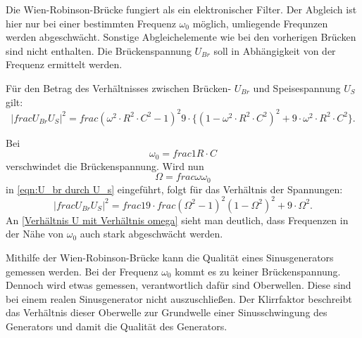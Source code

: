 Die Wien-Robinson-Brücke fungiert als ein elektronischer Filter.
Der Abgleich ist hier nur bei einer bestimmten Frequenz $\omega_0$ möglich, umliegende Frequnzen werden abgeschwächt.
Sonstige Abgleichelemente wie bei den vorherigen Brücken sind nicht enthalten.
Die Brückenspannung $U_{Br}$ soll in Abhängigkeit von der Frequenz ermittelt werden.

Für den Betrag des Verhältnisses zwischen Brücken- $U_{Br}$ und Speisespannung $U_S$ gilt:
\begin{equation}
    \label{eqn:U_br durch U_s}
    \lvert{frac{U_{Br}}{U_S}}\rvert^2 = frac{(\omega^2 \cdot R^2 \cdot C^2 - 1)^2}{9 \cdot \{(1 - \omega^2 \cdot R^2 \cdot C^2)^2 + 9 \cdot \omega^2 \cdot R^2 \cdot C^2\}} .
\end{equation}

Bei 
\begin{equation}
    \omega_0 = frac{1}{R \cdot C}
\end{equation}
verschwindet die Brückenspannung.
Wird nun
\begin{equation}
    \Omega = frac{\omega}{\omega_0}
\end{equation}
in \eqref{eqn:U_br durch U_s} eingeführt, folgt für das Verhältnis der Spannungen:
\begin{equation}
    \label{eqn:Verhältnis U mit Verhältnis omega}
    \lvert{frac{U_{Br}}{U_S}}\rvert^2 = frac{1}{9} \cdot frac{(\Omega^2 - 1)^2}{(1 - \Omega^2)^2 + 9 \cdot \Omega^2} .
\end{equation}
An \eqref{Verhältnis U mit Verhältnis omega} sieht man deutlich, dass Frequenzen in der Nähe von $\omega_0$ auch stark abgeschwächt werden.

Mithilfe der Wien-Robinson-Brücke kann die Qualität eines Sinusgenerators gemessen werden.
Bei der Frequenz $\omega_0$ kommt es zu keiner Brückenspannung.
Dennoch wird etwas gemessen, verantwortlich dafür sind Oberwellen.
Diese sind bei einem realen Sinusgenerator nicht auszuschließen.
Der Klirrfaktor beschreibt das Verhältnis dieser Oberwelle zur Grundwelle einer Sinusschwingung des Generators
und damit die Qualität des Generators.